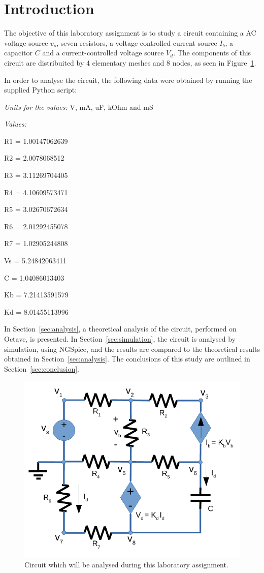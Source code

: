 \section{Introduction}
\label{sec:introduction}
The objective of this laboratory assignment is to study a circuit containing a
AC voltage source $v_s$, seven resistors, a voltage-controlled current source $I_b$, a capacitor $C$
and a current-controlled voltage source $V_d$. The components of this circuit are distribuited 
by 4 elementary meshes and 8 nodes, as seen in Figure~\ref{fig:circuit}. 

In order to analyse the circuit, the following data were obtained by running the supplied Python script: 

\textit{Units for the values:} V, mA, uF, kOhm and mS\par
\textit{Values:}


 

R1 = 1.00147062639\par
R2 = 2.0078068512\par
R3 = 3.11269704405\par
R4 = 4.10609573471\par
R5 = 3.02670672634\par
R6 = 2.01292455078\par
R7 = 1.02905244808\par
Vs = 5.24842063411\par
C = 1.04086013403\par
Kb = 7.21413591579\par
Kd = 8.01455113996


In Section~\ref{sec:analysis}, a theoretical analysis of the circuit, 
performed on Octave, is presented. In Section~\ref{sec:simulation}, the 
circuit is analysed by simulation, using NGSpice, and the results are compared to 
the theoretical results obtained in Section~\ref{sec:analysis}. The conclusions 
of this study are outlined in Section~\ref{sec:conclusion}.

\begin{figure}[H] \centering
\includegraphics[width=0.4\linewidth]{circuit.pdf}
\caption{Circuit which will be analysed during this laboratory assignment.}
\label{fig:circuit}
\end{figure}

